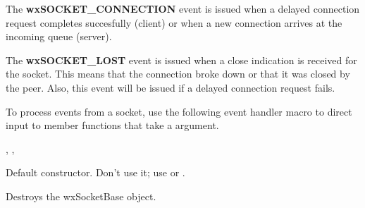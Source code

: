 The {\bf wxSOCKET\_CONNECTION} event is issued when a delayed connection
request completes succesfully (client) or when a new connection arrives
at the incoming queue (server).

The {\bf wxSOCKET\_LOST} event is issued when a close indication is
received for the socket. This means that the connection broke down or
that it was closed by the peer. Also, this event will be issued if
a delayed connection request fails.


To process events from a socket, use the following event handler macro to direct
input to member functions that take a  argument.

\twocolwidtha{7cm}%
\begin{twocollist}\itemsep=0pt
\end{twocollist}


, 
, 




Default constructor. Don't use it; use  
or .



Destroys the wxSocketBase object.


